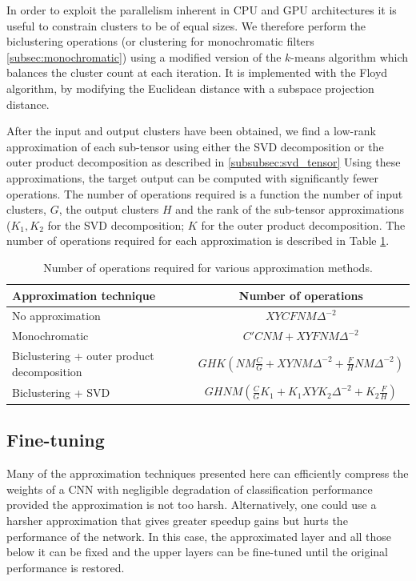 In order to exploit the parallelism inherent in CPU and GPU
architectures it is useful to constrain clusters to be of equal sizes.
We therefore perform the biclustering operations (or clustering 
for monochromatic filters \ref{subsec:monochromatic}) using a modified
version of the $k$-means algorithm which balances the cluster count at
each iteration. 
It is implemented with the Floyd algorithm, by modifying the Euclidean distance
with a subspace projection distance.

After the input and output clusters have been obtained, we find a low-rank approximation of each 
sub-tensor using either the SVD decomposition or the outer product decomposition as described in \ref{subsubsec:svd_tensor}   
Using these approximations, the target
output can be computed with significantly fewer operations. The number
of operations required is a function the number
of input clusters, $G$, the output clusters $H$ and the rank of the sub-tensor 
approximations ($K_1, K_2$ for the SVD decomposition; $K$ for the outer product decomposition.  
The number of operations required for each approximation is described in Table \ref{table:ops}.

\begin{table}[t]
\small
\centering
\begin{tabular}{|lc|}
\hline
{\bf Approximation technique} & {\bf Number of operations} \\
\hline
\hline
No approximation & $X Y C F N M \Delta^{-2}$\\
Monochromatic & $C' C N M + X Y F N M \Delta^{-2}$\\
Biclustering + outer product decomposition & $G H K (N M \frac{C}{G} + X Y N M \Delta^{-2} + \frac{F}{H} N M \Delta^{-2})$ \\  
Biclustering + SVD & $G H N M (\frac{C}{G}K_1 + K_1 X Y K_2 \Delta^{-2} + K_2\frac{F}{H})$\\
\hline
\end{tabular}
\caption{Number of operations required for various approximation methods.} 
\label{table:ops}
\end{table}

\subsection{Fine-tuning}
Many of the approximation techniques presented here can efficiently compress the weights of a CNN with negligible degradation of classification performance provided the approximation is not too harsh.
Alternatively, one could use a harsher approximation that gives greater speedup gains but hurts the performance of the network. In this case, the approximated layer and all those below it can be fixed and the upper layers can be fine-tuned until the original performance is restored.  
